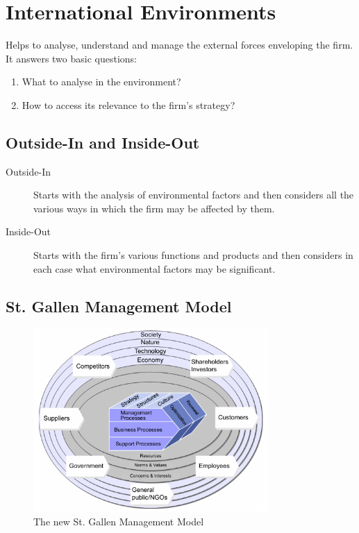 \section{International Environments}

Helps to analyse, understand and manage the external forces enveloping the firm. It answers two basic questions:

\begin{enumerate}
	\tightlist
	\item What to analyse in the environment?
	\item How to access its relevance to the firm's strategy?
\end{enumerate}

\subsection{Outside-In and Inside-Out}
\begin{description}
	\item[Outside-In] Starts with the analysis of environmental factors and then considers all the various ways in which the firm may be affected by them.
	\item[Inside-Out] Starts with the firm’s various functions and products and then considers in each case what environmental factors may be significant.
\end{description}

\subsection{St. Gallen Management Model}
\begin{figure}[H]
	\centering
	\includegraphics[width=0.8\textwidth]{figures/stgallen_mgmtModel.png}
	\caption{The new St. Gallen Management Model}
\end{figure}

